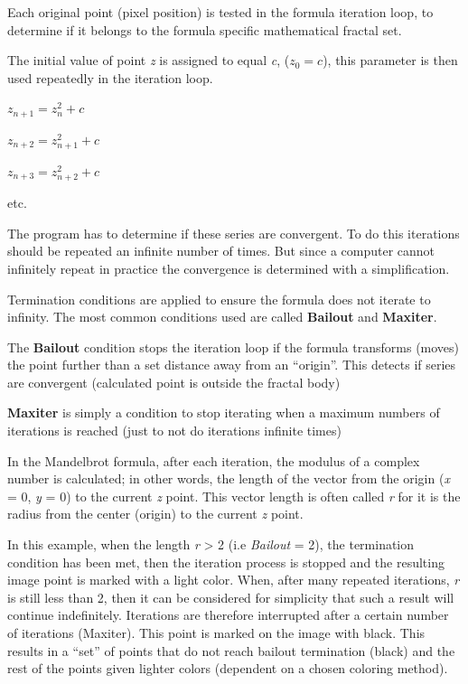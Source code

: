 Each original point (pixel position) is tested in the formula iteration loop, to
determine if it belongs to the formula specific mathematical fractal set.

The initial value of point \emph{z} is assigned to equal \emph{c}, ($ z_{0} = c
$), this parameter is then used repeatedly in the iteration loop.

\(z_{n + 1} = z_{n}^{2} + c\)

\(z_{n + 2} = z_{n + 1}^{2} + c\)

\(z_{n + 3} = z_{n + 2}^{2} + c\)

etc.

The program has to determine if these series are convergent. To do this
iterations should be repeated an infinite number of times. But since a computer cannot
infinitely repeat in practice the convergence is determined with a simplification.

Termination conditions are applied to ensure the formula does not iterate to
infinity. The most common conditions used are called \textbf{Bailout} and
\textbf{Maxiter}.

\label{bailout-maxiter}The \textbf{Bailout} condition stops the iteration loop if the formula
transforms (moves) the point further than a set distance away from an
``origin''. This detects if series are convergent (calculated point is outside
the fractal body)

\textbf{Maxiter} is simply a condition to stop iterating when a maximum numbers
of iterations is reached (just to not do iterations infinite times)

In the Mandelbrot formula, after each iteration, the modulus of a complex number
is calculated; in other words, the length of the vector from the origin
(\emph{x} = 0, \emph{y} = 0) to the current \emph{z} point. This vector length
is often called \emph{r} for it is the radius from the center (origin) to the
current \emph{z} point.

In this example, when the length \emph{r} \textgreater{} 2 (i.e \emph{Bailout} =
2), the termination condition has been met, then the iteration process is
stopped and the resulting image point is marked with a light color. When, after
many repeated iterations, \emph{r} is still less than 2, then it can be
considered for simplicity that such a result will continue indefinitely.
Iterations are therefore interrupted after a certain number of iterations
(Maxiter). This point is marked on the image with black. This results in a
``set'' of points that do not reach bailout termination (black) and the rest of
the points given lighter colors (dependent on a chosen coloring method).

